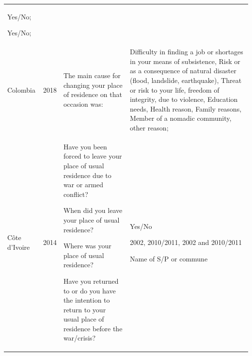 \documentclass[
]{article}
\begin{document}
\begin{longtable}[]{@{}llll@{}}
\begin{minipage}[t]{0.22\columnwidth}
Yes/No;

Yes/No;\strut
\end{minipage}\tabularnewline
\begin{minipage}[t]{0.22\columnwidth}\raggedright
Colombia\strut
\end{minipage} & \begin{minipage}[t]{0.22\columnwidth}\raggedright
2018\strut
\end{minipage} & \begin{minipage}[t]{0.22\columnwidth}\raggedright
The main cause
for changing
your place of
residence on
that occasion
was:\strut
\end{minipage} & \begin{minipage}[t]{0.22\columnwidth}\raggedright
Difficulty in
finding a job
or shortages in
your means of
subsistence,
Risk or as a
consequence of
natural
disaster
(flood,
landslide,
earthquake),
Threat or risk
to your life,
freedom of
integrity, due
to violence,
Education
needs, Health
reason, Family
reasons, Member
of a nomadic
community,
other reason;\strut
\end{minipage}\tabularnewline
\begin{minipage}[t]{0.22\columnwidth}\raggedright
Côte d'Ivoire\strut
\end{minipage} & \begin{minipage}[t]{0.22\columnwidth}\raggedright
2014\strut
\end{minipage} & \begin{minipage}[t]{0.22\columnwidth}\raggedright
Have you been
forced to leave
your place of
usual residence
due to war or
armed conflict?

When did you
leave your
place of usual
residence?

Where was your
place of usual
residence?

Have you
returned to or
do you have the
intention to
return to your
usual place of
residence
before the
war/crisis?\strut
\end{minipage} & \begin{minipage}[t]{0.22\columnwidth}\raggedright
Yes/No

2002,
2010/2011, 2002
and 2010/2011

Name of S/P or
commune


\end{minipage}
\end{longtable}
\end{document}
